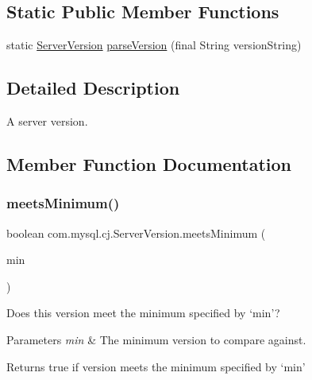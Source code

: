 \subsection*{Static Public Member Functions}
\begin{DoxyCompactItemize}
\item 
static \mbox{\hyperlink{classcom_1_1mysql_1_1cj_1_1_server_version}{Server\+Version}} \mbox{\hyperlink{classcom_1_1mysql_1_1cj_1_1_server_version_a058b132076121d8763c12432b943b219}{parse\+Version}} (final String version\+String)
\end{DoxyCompactItemize}


\subsection{Detailed Description}
A server version. 

\subsection{Member Function Documentation}
\mbox{\label{classcom_1_1mysql_1_1cj_1_1_server_version_abc8b53b9a5a5bf7acc4665d620c07fda}} 
\subsubsection{\texorpdfstring{meets\+Minimum()}{meetsMinimum()}}
{\footnotesize\ttfamily boolean com.\+mysql.\+cj.\+Server\+Version.\+meets\+Minimum (\begin{DoxyParamCaption}\item[{\mbox{\hyperlink{classcom_1_1mysql_1_1cj_1_1_server_version}{Server\+Version}}}]{min }\end{DoxyParamCaption})}

Does this version meet the minimum specified by `min'?


\begin{DoxyParams}{Parameters}
{\em min} & The minimum version to compare against. \\
\hline
\end{DoxyParams}
\begin{DoxyReturn}{Returns}
true if version meets the minimum specified by `min' 
\end{DoxyReturn}
\mbox{\label{classcom_1_1mysql_1_1cj_1_1_server_version_a058b132076121d8763c12432b943b219}} 
